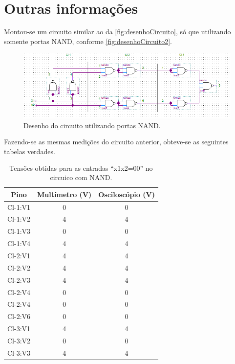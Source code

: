 \chapter{Outras informações}
	Montou-se um circuito similar ao da \autoref{fig:desenhoCircuito}, só que utilizando
	somente portas NAND, conforme \autoref{fig:desenhoCircuito2}.

	\begin{figure}[H]
		\centering
		\caption{\label{fig:desenhoCircuito2}Desenho do circuito utilizando portas NAND.}
		\includegraphics[width=1\textwidth]{img/DesenhoCircuito2.png}
	\end{figure}

	Fazendo-se as mesmas medições do circuito anterior, obteve-se as seguintes tabelas verdades.

	\begin{table}[H]
	   \centering
	   \caption{Tensões obtidas para as entradas “x1x2=00” no circuico com NAND.}
	   \label{table:tabelaVerdade20}
	   \begin{tabular}{c|c|c}
		   \textbf{Pino} & \textbf{Multímetro (V)} & \textbf{Osciloscópio (V)}\\
		   \hline
		   Cl-1:V1 & 0 & 0 \\
		   Cl-1:V2 & 4 & 4 \\
		   Cl-1:V3 & 0 & 0 \\
		   Cl-1:V4 & 4 & 4 \\
		   \hline
		   Cl-2:V1 & 4 & 4 \\
		   Cl-2:V2 & 4 & 4 \\
		   Cl-2:V3 & 4 & 4 \\
		   Cl-2:V4 & 0 & 0 \\
		   Cl-2:V4 & 0 & 0 \\
		   Cl-2:V6 & 0 & 0 \\
		   \hline
		   Cl-3:V1 & 4 & 4 \\
		   Cl-3:V2 & 0 & 0 \\
		   Cl-3:V3 & 4 & 4 \\
	   \end{tabular}
   \end{table}

